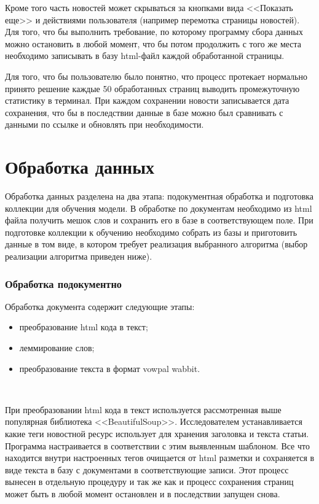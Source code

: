 Кроме того часть новостей может скрываться за кнопками вида <<Показать еще>> и действиями пользователя (например перемотка страницы новостей). Для того, что бы выполнить требование, по которому программу сбора данных можно остановить в любой момент, что бы потом продолжить с того же места необходимо записывать в базу html-файл каждой обработанной страницы.

Для того, что бы пользователю было понятно, что процесс протекает нормально принято решение каждые 50 обработанных страниц выводить промежуточную статистику в терминал. При каждом сохранении новости записывается дата сохранения, что бы в последствии данные в базе можно был сравнивать с данными по ссылке и обновлять при необходимости.

\section{Обработка данных}

Обработка данных разделена на два этапа: подокументная обработка и подготовка коллекции для обучения модели. В обработке по документам необходимо из html файла получить мешок слов и сохранить его в базе в соответствующем поле. При подготовке коллекции к обучению необходимо собрать из базы и приготовить данные в том виде, в котором требует реализация выбранного алгоритма (выбор реализации алгоритма приведен ниже).

\subsubsection{Обработка подокументно}

Обработка документа содержит следующие этапы:

\begin{itemize}
    \item преобразование html кода в текст;
    \item леммирование слов;
    \item преобразование текста в формат vowpal wabbit.
\end{itemize}
~\

При преобразовании html кода в текст используется рассмотренная выше популярная библиотека <<BeautifulSoup>>. Исследователем устанавливается какие теги новостной ресурс использует для хранения заголовка и текста статьи. Программа настраивается в соответствии с этим выявленным шаблоном. Все что находится внутри настроенных тегов очищается от html разметки и сохраняется в виде текста в базу с документами в соответствующие записи. Этот процесс вынесен в отдельную процедуру и так же как и процесс сохранения страниц может быть в любой момент остановлен и в последствии запущен снова.

